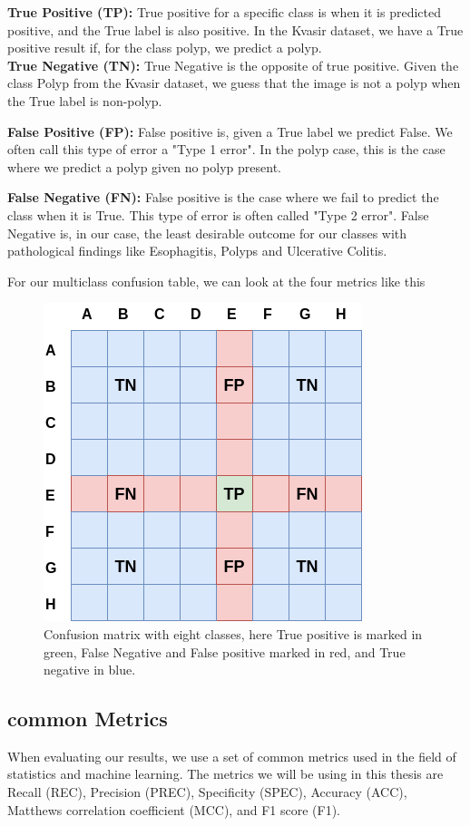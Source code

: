 \textbf{True Positive (TP): } True positive for a specific class is when it is predicted positive, and the True label is also positive.  In the Kvasir dataset, we have a True positive result if, for the class polyp, we predict a polyp.\\

\textbf{True Negative (TN): } True Negative is the opposite of true positive. Given the class Polyp from the Kvasir dataset, we guess that the image is not a polyp when the True label is non-polyp. 

\textbf{False Positive (FP): } False positive is, given a True label we predict False. We often call this type of error a "Type 1 error".   In the polyp case, this is the case where we predict a polyp given no polyp present.


\textbf{False Negative (FN): } False positive is the case where we fail to predict the class when it is True. This type of error is often called "Type 2 error". False Negative is, in our case, the least desirable outcome for our classes with pathological findings like Esophagitis, Polyps and Ulcerative Colitis.

For our multiclass confusion table, we can look at the four metrics like this
\begin{figure}[h]
\centering
\includegraphics[scale=0.7]{experiments/figures/confusionmatrix.png}
\caption{
Confusion matrix with eight classes, here True positive is marked in green, False Negative and False positive marked in red, and True negative in blue.
}
\label{fig:confusionmatrix}
\end{figure}


\subsection{common Metrics}
When evaluating our results, we use a set of common metrics used in the field of statistics and machine learning.  The metrics we will be using in this thesis are Recall (REC), Precision (PREC), Specificity (SPEC), Accuracy (ACC), Matthews correlation coefficient (MCC), and F1 score (F1). 


